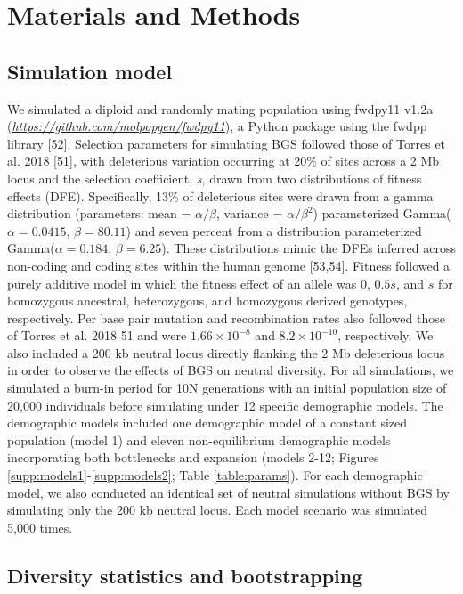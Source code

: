 \documentclass[9pt,twocolumn,twoside]{rilabRxiv}
\begin{document}
\section{Materials and Methods}
\label{sec:materials:methods}

\subsection{Simulation model}

We simulated a diploid and randomly mating population using fwdpy11 v1.2a (\href{https://github.com/molpopgen/fwdpy11}{\emph{https://github.com/molpopgen/fwdpy11}}), a Python package using the fwdpp library [52]. 
Selection parameters for simulating BGS followed those of Torres et al. 2018 [51], with deleterious variation occurring at 20\% of sites across a 2 Mb locus and the selection coefficient, \textit{s}, drawn from two distributions of fitness effects (DFE). 
Specifically, 13\% of deleterious sites were drawn from a gamma distribution (parameters: mean = $\alpha/\beta$, variance = $\alpha/\beta^2$) parameterized Gamma($\alpha = 0.0415$, $\beta = 80.11$) and seven percent from a distribution parameterized Gamma($\alpha = 0.184$, $\beta = 6.25$). 
These distributions mimic the DFEs inferred across non-coding and coding sites within the human genome [53,54]. 
Fitness followed a purely additive model in which the fitness effect of an allele was 0, $0.5s$, and $s$ for homozygous ancestral, heterozygous, and homozygous derived genotypes, respectively. 
Per base pair mutation and recombination rates also followed those of Torres et al. 2018 {51} and were $1.66 \times 10^{-8}$ and $8.2 \times 10^{-10}$, respectively. 
We also included a 200 kb neutral locus directly flanking the 2 Mb deleterious locus in order to observe the effects of BGS on neutral diversity. 
For all simulations, we simulated a burn-in period for 10N generations with an initial population size of 20,000 individuals before simulating under 12 specific demographic models. 
The demographic models included one demographic model of a constant sized population (model 1) and eleven non-equilibrium demographic models incorporating both bottlenecks and expansion (models 2-12; Figures \ref{supp:models1}-\ref{supp:models2}; Table \ref{table:params}). 
For each demographic model, we also conducted an identical set of neutral simulations without BGS by simulating only the 200 kb neutral locus. 
Each model scenario was simulated 5,000 times.

\subsection{Diversity statistics and bootstrapping}
\end{document}
